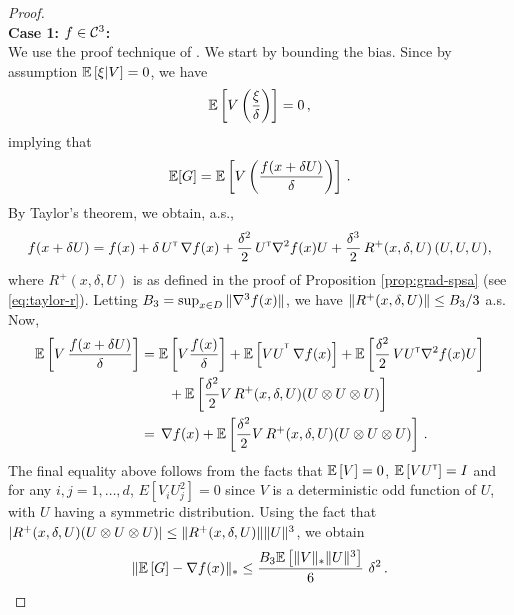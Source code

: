 \begin{proof}\ \\
\textbf{Case 1: $f \in \mathcal{C}^3$:}\ \\
We use the proof technique of \cite{spall1997one}.
We start by bounding the bias.
Since by assumption $\mathbb{E}\left[ \xi|V\right]=0$, we have
\begin{align*}
\mathbb{E}\left[  V\left(\dfrac{\xi}{\delta}\right) \right]= 0\,,
\end{align*}
implying that
\begin{align*}
\mathbb{E}[G] =  \mathbb{E}\left[ V \left(\dfrac{f(x+\delta U) }{\delta}\right)\right] \,.
\end{align*}
By Taylor's theorem, we obtain, a.s.,
\begin{align*}
f(x + \delta U) =
 f(x)
 +\delta\,  U^\mathsf{\scriptscriptstyle T}\,\nabla f(x)
  + \frac{\delta^2}{2}\, U^\mathsf{\scriptscriptstyle T} \nabla^2 f(x) U
  +  \frac{\delta^3}{2} \, R^{+}(x,\delta,U) \,(U, U, U),
\end{align*}
where $R^{+}(x,\delta,U)$ is as defined in the proof of Proposition \ref{prop:grad-spsa} (see \eqref{eq:taylor-r}).
Letting $B_3 = \sup_{x\in D} \| \nabla^3 f(x) \|$,%
we have $\| R^{+}(x,\delta,U)\| \le B_3/3$ a.s.
Now,
\begin{align*}
\mathbb{E}\left[V\, \dfrac{f(x+\delta U)}{\delta}\right]
&= \mathbb{E}\left[V \frac{f(x)}{\delta}\right] +  \mathbb{E}\left[VU^{^\mathsf{\scriptscriptstyle T}}
\, \nabla f(x)\right]  + \mathbb{E}\left[\frac{\delta^2}{2}\, V U^\mathsf{\scriptscriptstyle T} \nabla^2 f(x) U\right] \\
&\qquad+   \mathbb{E}\left[\frac{\delta^2}{2}  V \,R^{+}(x,\delta,U)(U \otimes U \otimes U)\right]
\\
&= \, \nabla f(x)  + \mathbb{E}\left[\frac{\delta^2}{2}  V \,R^{+}(x,\delta,U)(U \otimes U \otimes U)\right]\,.
\end{align*}
The final equality above follows from the facts that $\mathbb{E}\left[V\right] = 0$, $\mathbb{E}\left[V U^\mathsf{\scriptscriptstyle T}\right] = I$ and for any $i,j=1,\ldots,d$, $E[V_i U_j^2] = 0$ since $V$ is a deterministic odd function of $U$, with $U$ having a symmetric distribution.
Using the fact that $|R^{+}(x,\delta,U) (U \otimes U \otimes U)| \le
\|R^{+}(x,\delta,U)\| \|U\|^3$,
we obtain
\begin{align*}
\| \mathbb{E}\left[ G \right] - \nabla f(x) \|_*
\le \frac{B_3 \mathbb{E}\left[ \|V\|_* \|U\|^3 \right]}{6}\,\, \delta^2 \,.
\end{align*}


\end{proof}
